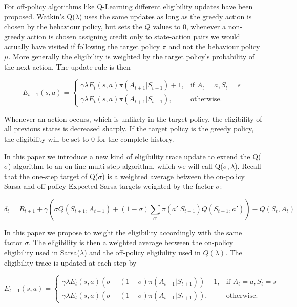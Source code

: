 \documentclass{article} %
\begin{document}
For off-policy algorithms like Q-Learning different eligibility updates have been proposed. Watkin's Q($\lambda$) uses the same updates as long as the greedy action is chosen by the behaviour policy, but sets the $Q$ values to 0, whenever a non-greedy action is chosen assigning credit only to state-action pairs we would actually have visited if following the target policy $\pi$ and not the behaviour policy $\mu$. More generally the eligibility is weighted by the target policy's probability of the next action. The update rule is then

\begin{equation}
    E_{t+1}(s, a) =
\begin{cases}
    \gamma \lambda E_t(s, a) \pi(A_{t+1} | S_{t+1}) + 1, & \text{if } A_t = a, S_t = s\\
    \gamma \lambda E_t(s, a) \pi(A_{t+1} | S_{t+1}),    & \text{otherwise.}
\end{cases}
\end{equation}

Whenever an action occurs, which is unlikely in the target policy, the eligibility of all previous states is decreased sharply. If the target policy is the greedy policy, the eligibility will be set to 0 for the complete history.

In this paper we introduce a new kind of eligibility trace update to extend the Q($\sigma$) algorithm to an on-line multi-step algorithm, which we will call Q($\sigma, \lambda$).
Recall that the one-step target of Q($\sigma$) is a weighted average between the on-policy Sarsa and off-policy Expected Sarsa targets weighted by the factor $\sigma$:

\begin{equation} 
\delta_t = R_{t+1} + \gamma ( \sigma Q(S_{t+1}, A_{t+1}) +  (1 - \sigma) \sum_{a'} \pi(a' | S_{t+1}) Q(S_{t+1}, a') ) - Q(S_t, A_t)
\end{equation}

In this paper we propose to weight the eligibility accordingly with the same factor $\sigma$. The eligibility is then a weighted average between the on-policy eligibility used in Sarsa($\lambda$) and the off-policy eligibility used in $Q(\lambda)$. The eligibility trace is updated at each step by

\begin{equation}
    E_{t+1}(s, a) =
\begin{cases}
    \gamma \lambda E_t(s, a) (\sigma + (1 - \sigma) \pi(A_{t+1} | S_{t+1})) + 1, & \text{if } A_t = a, S_t = s\\
    \gamma \lambda E_t(s, a) (\sigma + (1 - \sigma) \pi(A_{t+1} | S_{t+1})),    & \text{otherwise.}
\end{cases}
\end{equation}
\end{document}
